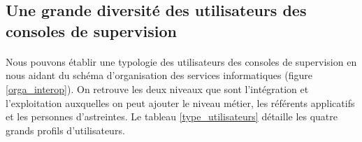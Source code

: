 		\subsection{Une grande diversité des utilisateurs des consoles de
		supervision}
			\paragraph{}%
			Nous pouvons établir une typologie des utilisateurs des consoles de
			supervision en nous aidant du schéma d’organisation
			des services informatiques (figure \ref{orga_interop}). On retrouve les
			deux niveaux que sont l’intégration et l’exploitation auxquelles on peut
			ajouter le niveau métier, les référents applicatifs et les personnes
			d'astreintes.
			Le tableau \ref{type_utilisateurs} détaille les quatre grands profils
			d’utilisateurs.
